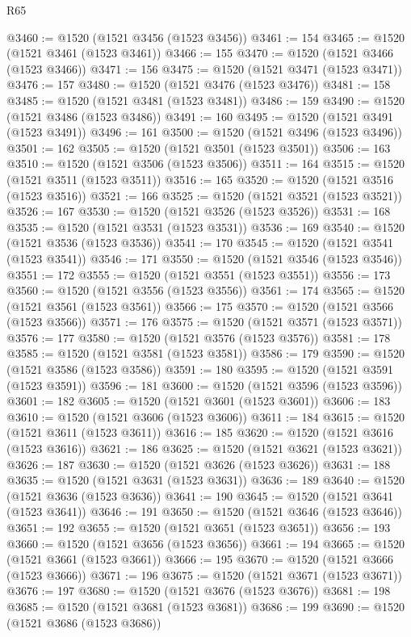 \begin{lexlean}{R65}
\begin{coremodule}
{@3460 := @1520 (@1521 @3456 (@1523 @3456))
@3461 := 154
@3465 := @1520 (@1521 @3461 (@1523 @3461))
@3466 := 155
@3470 := @1520 (@1521 @3466 (@1523 @3466))
@3471 := 156
@3475 := @1520 (@1521 @3471 (@1523 @3471))
@3476 := 157
@3480 := @1520 (@1521 @3476 (@1523 @3476))
@3481 := 158
@3485 := @1520 (@1521 @3481 (@1523 @3481))
@3486 := 159
@3490 := @1520 (@1521 @3486 (@1523 @3486))
@3491 := 160
@3495 := @1520 (@1521 @3491 (@1523 @3491))
@3496 := 161
@3500 := @1520 (@1521 @3496 (@1523 @3496))
@3501 := 162
@3505 := @1520 (@1521 @3501 (@1523 @3501))
@3506 := 163
@3510 := @1520 (@1521 @3506 (@1523 @3506))
@3511 := 164
@3515 := @1520 (@1521 @3511 (@1523 @3511))
@3516 := 165
@3520 := @1520 (@1521 @3516 (@1523 @3516))
@3521 := 166
@3525 := @1520 (@1521 @3521 (@1523 @3521))
@3526 := 167
@3530 := @1520 (@1521 @3526 (@1523 @3526))
@3531 := 168
@3535 := @1520 (@1521 @3531 (@1523 @3531))
@3536 := 169
@3540 := @1520 (@1521 @3536 (@1523 @3536))
@3541 := 170
@3545 := @1520 (@1521 @3541 (@1523 @3541))
@3546 := 171
@3550 := @1520 (@1521 @3546 (@1523 @3546))
@3551 := 172
@3555 := @1520 (@1521 @3551 (@1523 @3551))
@3556 := 173
@3560 := @1520 (@1521 @3556 (@1523 @3556))
@3561 := 174
@3565 := @1520 (@1521 @3561 (@1523 @3561))
@3566 := 175
@3570 := @1520 (@1521 @3566 (@1523 @3566))
@3571 := 176
@3575 := @1520 (@1521 @3571 (@1523 @3571))
@3576 := 177
@3580 := @1520 (@1521 @3576 (@1523 @3576))
@3581 := 178
@3585 := @1520 (@1521 @3581 (@1523 @3581))
@3586 := 179
@3590 := @1520 (@1521 @3586 (@1523 @3586))
@3591 := 180
@3595 := @1520 (@1521 @3591 (@1523 @3591))
@3596 := 181
@3600 := @1520 (@1521 @3596 (@1523 @3596))
@3601 := 182
@3605 := @1520 (@1521 @3601 (@1523 @3601))
@3606 := 183
@3610 := @1520 (@1521 @3606 (@1523 @3606))
@3611 := 184
@3615 := @1520 (@1521 @3611 (@1523 @3611))
@3616 := 185
@3620 := @1520 (@1521 @3616 (@1523 @3616))
@3621 := 186
@3625 := @1520 (@1521 @3621 (@1523 @3621))
@3626 := 187
@3630 := @1520 (@1521 @3626 (@1523 @3626))
@3631 := 188
@3635 := @1520 (@1521 @3631 (@1523 @3631))
@3636 := 189
@3640 := @1520 (@1521 @3636 (@1523 @3636))
@3641 := 190
@3645 := @1520 (@1521 @3641 (@1523 @3641))
@3646 := 191
@3650 := @1520 (@1521 @3646 (@1523 @3646))
@3651 := 192
@3655 := @1520 (@1521 @3651 (@1523 @3651))
@3656 := 193
@3660 := @1520 (@1521 @3656 (@1523 @3656))
@3661 := 194
@3665 := @1520 (@1521 @3661 (@1523 @3661))
@3666 := 195
@3670 := @1520 (@1521 @3666 (@1523 @3666))
@3671 := 196
@3675 := @1520 (@1521 @3671 (@1523 @3671))
@3676 := 197
@3680 := @1520 (@1521 @3676 (@1523 @3676))
@3681 := 198
@3685 := @1520 (@1521 @3681 (@1523 @3681))
@3686 := 199
@3690 := @1520 (@1521 @3686 (@1523 @3686))
}
\end{coremodule}
\end{lexlean}
